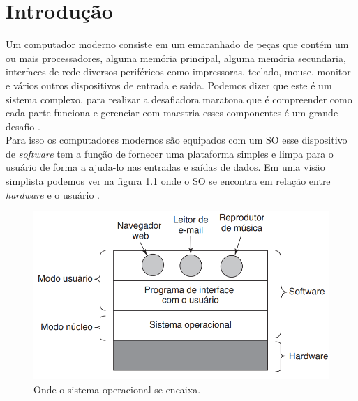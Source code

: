 
\chapter[Introdução]{Introdução}

Um computador moderno consiste em um emaranhado de peças que contém um ou mais processadores, alguma memória principal, alguma memória secundaria, interfaces de rede diversos periféricos como impressoras, teclado, mouse, monitor e vários outros dispositivos de entrada e saída. Podemos dizer que este é um sistema complexo, para realizar a desafiadora maratona que é compreender como cada parte funciona e gerenciar com maestria esses componentes é um grande desafio \cite{Tanenbaum2016}.\\
Para isso os computadores modernos são equipados com um SO esse dispositivo de \emph{software} tem a função de fornecer uma plataforma simples e limpa para o usuário de forma a ajuda-lo nas entradas e saídas de dados. Em uma visão simplista podemos ver na figura \ref{fig:figura1} onde o SO se encontra em relação entre \emph{hardware} e o usuário \cite{Tanenbaum2016}. 

\begin{figure}[htpb]
    \centering
   \includegraphics[scale=.4]{imagens/figura1.png}
   \caption{Onde o sistema operacional se encaixa. \cite{Tanenbaum2016}}
   \label{fig:figura1}
\end{figure}

